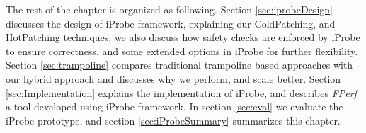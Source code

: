 

%


%




The rest of the chapter is organized as following. 
Section \ref{sec:iprobeDesign} discusses the design of iProbe framework, explaining our ColdPatching, and HotPatching techniques;
we also discuss how safety checks are enforced by iProbe to ensure correctness, and some extended options in iProbe for further flexibility.
Section \ref{sec:trampoline} compares traditional trampoline based approaches with our hybrid approach and discusses why we perform, and scale better.
Section \ref{sec:Implementation} explains the implementation of iProbe, 
and describes \emph{FPerf} a tool developed using iProbe framework. 
In section \ref{sec:eval} we evaluate the iProbe prototype, 
and section \ref{sec:iProbeSummary} summarizes this chapter.
